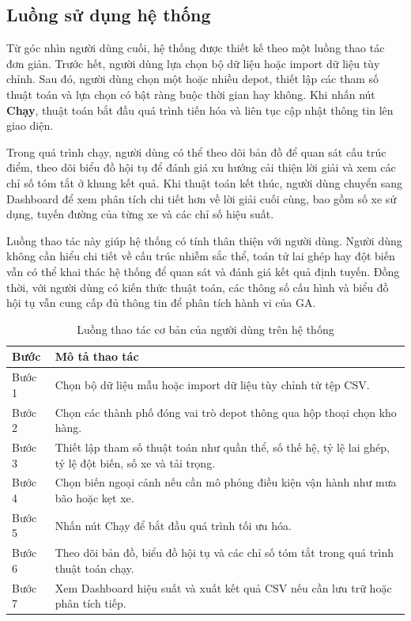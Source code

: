 \documentclass[12pt,a4paper]{article}
\numberwithin{figure}{subsection}
\begin{document}
\subsection{Luồng sử dụng hệ thống}

Từ góc nhìn người dùng cuối, hệ thống được thiết kế theo một luồng thao tác đơn giản. Trước hết, người dùng lựa chọn bộ dữ liệu hoặc import dữ liệu tùy chỉnh. Sau đó, người dùng chọn một hoặc nhiều depot, thiết lập các tham số thuật toán và lựa chọn có bật ràng buộc thời gian hay không. Khi nhấn nút \textbf{Chạy}, thuật toán bắt đầu quá trình tiến hóa và liên tục cập nhật thông tin lên giao diện.

Trong quá trình chạy, người dùng có thể theo dõi bản đồ để quan sát cấu trúc điểm, theo dõi biểu đồ hội tụ để đánh giá xu hướng cải thiện lời giải và xem các chỉ số tóm tắt ở khung kết quả. Khi thuật toán kết thúc, người dùng chuyển sang Dashboard để xem phân tích chi tiết hơn về lời giải cuối cùng, bao gồm số xe sử dụng, tuyến đường của từng xe và các chỉ số hiệu suất.

Luồng thao tác này giúp hệ thống có tính thân thiện với người dùng. Người dùng không cần hiểu chi tiết về cấu trúc nhiễm sắc thể, toán tử lai ghép hay đột biến vẫn có thể khai thác hệ thống để quan sát và đánh giá kết quả định tuyến. Đồng thời, với người dùng có kiến thức thuật toán, các thông số cấu hình và biểu đồ hội tụ vẫn cung cấp đủ thông tin để phân tích hành vi của GA.

\begin{table}[H]
    \centering
    \caption{Luồng thao tác cơ bản của người dùng trên hệ thống}
    \label{tab:user_workflow}
    \renewcommand{\arraystretch}{1.35}
    \begin{tabular}{|p{3cm}|p{10.8cm}|}
        \hline
        \textbf{Bước} & \textbf{Mô tả thao tác} \\
        \hline
        Bước 1 & Chọn bộ dữ liệu mẫu hoặc import dữ liệu tùy chỉnh từ tệp CSV. \\
        \hline
        Bước 2 & Chọn các thành phố đóng vai trò depot thông qua hộp thoại chọn kho hàng. \\
        \hline
        Bước 3 & Thiết lập tham số thuật toán như quần thể, số thế hệ, tỷ lệ lai ghép, tỷ lệ đột biến, số xe và tải trọng. \\
        \hline
        Bước 4 & Chọn biến ngoại cảnh nếu cần mô phỏng điều kiện vận hành như mưa bão hoặc kẹt xe. \\
        \hline
        Bước 5 & Nhấn nút Chạy để bắt đầu quá trình tối ưu hóa. \\
        \hline
        Bước 6 & Theo dõi bản đồ, biểu đồ hội tụ và các chỉ số tóm tắt trong quá trình thuật toán chạy. \\
        \hline
        Bước 7 & Xem Dashboard hiệu suất và xuất kết quả CSV nếu cần lưu trữ hoặc phân tích tiếp. \\
        \hline
    \end{tabular}
\end{table}
\end{document}
